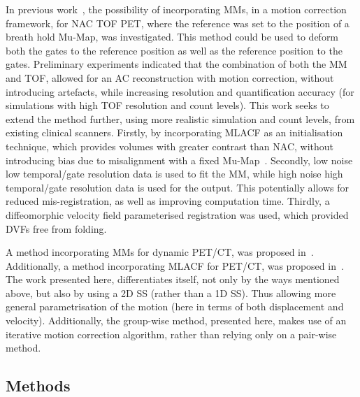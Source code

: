            In previous work~\parencite{Whitehead2019ImpactPET, Whitehead2020PET/CTFields, Whitehead2021ComparisonMap}, the possibility of incorporating \glspl{MM}, in a motion correction framework, for \gls{NAC} \gls{TOF} \gls{PET}, where the reference was set to the position of a breath hold \gls{Mu-Map}, was investigated. This method could be used to deform both the gates to the reference position as well as the reference position to the gates. Preliminary experiments indicated that the combination of both the \gls{MM} and \gls{TOF}, allowed for an \gls{AC} reconstruction with motion correction, without introducing artefacts, while increasing resolution and quantification accuracy (for simulations with high \gls{TOF} resolution and count levels). This work seeks to extend the method further, using more realistic simulation and count levels, from existing clinical scanners. Firstly, by incorporating \gls{MLACF} as an initialisation technique, which provides volumes with greater contrast than \gls{NAC}, without introducing bias due to misalignment with a fixed \gls{Mu-Map}~\parencite{Nuyts2012ML-reconstructionFactors}. Secondly, low noise low temporal/gate resolution data is used to fit the \gls{MM}, while high noise high temporal/gate resolution data is used for the output. This potentially allows for reduced mis-registration, as well as improving computation time. Thirdly, a diffeomorphic velocity field parameterised registration was used, which provided \glspl{DVF} free from folding.
            
            A method incorporating \glspl{MM} for dynamic \gls{PET}/\gls{CT}, was proposed in~\parencite{Chan2018Non-RigidPET}. Additionally, a method incorporating \gls{MLACF} for \gls{PET}/\gls{CT}, was proposed in~\parencite{Lu2018RespiratoryData}. The work presented here, differentiates itself, not only by the ways mentioned above, but also by using a \gls{2D} \gls{SS} (rather than a \gls{1D} \gls{SS}). Thus allowing more general parametrisation of the motion (here in terms of both displacement and velocity). Additionally, the group-wise method, presented here, makes use of an iterative motion correction algorithm, rather than relying only on a pair-wise method.
        
        \subsection{Methods} \label{sec:pet_ct_motion_correction_exploiting_motion_models_fit_on_coarsely_gated_data_applied_to_finely_gated_data_methods}
            
